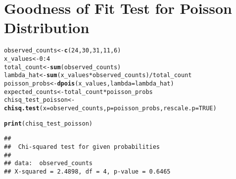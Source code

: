 \documentclass{article}\usepackage[]{graphicx}\usepackage[]{xcolor}
\makeatletter
\newcommand{\hlnum}[1]{\textcolor[rgb]{0.686,0.059,0.569}{#1}}%
\newcommand{\hlopt}[1]{\textcolor[rgb]{0,0,0}{#1}}%
\newcommand{\hldef}[1]{\textcolor[rgb]{0.345,0.345,0.345}{#1}}%
\newcommand{\hlkwb}[1]{\textcolor[rgb]{0.69,0.353,0.396}{#1}}%
\newcommand{\hlkwc}[1]{\textcolor[rgb]{0.333,0.667,0.333}{#1}}%
\newcommand{\hlkwd}[1]{\textcolor[rgb]{0.737,0.353,0.396}{\textbf{#1}}}%
\newenvironment{kframe}{%
 \def\at@end@of@kframe{}%
 \ifinner\ifhmode%
  \def\at@end@of@kframe{\end{minipage}}%
  \begin{minipage}{\columnwidth}%
 \fi\fi%
 \def\FrameCommand##1{\hskip\@totalleftmargin \hskip-\fboxsep
 \colorbox{shadecolor}{##1}\hskip-\fboxsep
     \hskip-\linewidth \hskip-\@totalleftmargin \hskip\columnwidth}%
 \MakeFramed {\advance\hsize-\width
   \@totalleftmargin\z@ \linewidth\hsize
   \@setminipage}}%
 {\par\unskip\endMakeFramed%
 \at@end@of@kframe}
\newenvironment{knitrout}{}{} %
\makeatother
\begin{document}
\section{Goodness of Fit Test for Poisson Distribution}
\begin{knitrout}
\color{fgcolor}\begin{kframe}
\begin{alltt}
\hldef{observed_counts} \hlkwb{<-} \hlkwd{c}\hldef{(}\hlnum{24}\hldef{,} \hlnum{30}\hldef{,} \hlnum{31}\hldef{,} \hlnum{11}\hldef{,} \hlnum{6}\hldef{)}
\hldef{x_values} \hlkwb{<-} \hlnum{0}\hlopt{:}\hlnum{4}
\hldef{total_count} \hlkwb{<-} \hlkwd{sum}\hldef{(observed_counts)}
\hldef{lambda_hat} \hlkwb{<-} \hlkwd{sum}\hldef{(x_values} \hlopt{*} \hldef{observed_counts)} \hlopt{/} \hldef{total_count}
\hldef{poisson_probs} \hlkwb{<-} \hlkwd{dpois}\hldef{(x_values,} \hlkwc{lambda} \hldef{= lambda_hat)}
\hldef{expected_counts} \hlkwb{<-} \hldef{total_count} \hlopt{*} \hldef{poisson_probs}
\hldef{chisq_test_poisson} \hlkwb{<-} \hlkwd{chisq.test}\hldef{(}\hlkwc{x} \hldef{= observed_counts,} \hlkwc{p} \hldef{= poisson_probs,} \hlkwc{rescale.p} \hldef{=} \hlnum{TRUE}\hldef{)}
\end{alltt}


{\ttfamily\noindent\color{warningcolor}{\#\# Warning in chisq.test(x = observed\_counts, p = poisson\_probs, rescale.p = TRUE): Chi-squared approximation may be incorrect}}\begin{alltt}
\hlkwd{print}\hldef{(chisq_test_poisson)}
\end{alltt}
\begin{verbatim}
## 
## 	Chi-squared test for given probabilities
## 
## data:  observed_counts
## X-squared = 2.4898, df = 4, p-value = 0.6465
\end{verbatim}
\end{kframe}
\end{knitrout}
\end{document}

